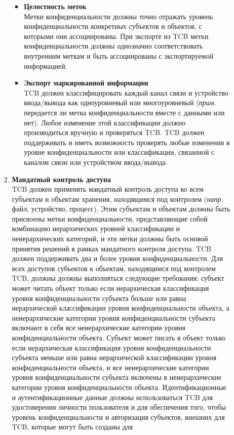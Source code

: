 \begin{enumerate}
\begin{enumerate}
\begin{enumerate}
\begin{itemize}
				\item{\textbf{Целостность меток}}\\
				Метки конфиденциальности должны точно отражать уровень конфиденциальности конкретных субъектов и объектов, с которыми они ассоциированы. При экспорте из TCB метки конфиденциальности
				должны однозначно соответствовать внутренним меткам и быть ассоциированы с экспортируемой информацией.
				\item{\textbf{Экспорт маркированной информации}}\\
				TCB должен классифицировать каждый канал связи и устройство ввода/вывода как одноуровневый или многоуровневый (\textit{прим. } передается ли метка конфиденциальности вместе с данными
				или нет). Любое изменение этой классификации должно производиться вручную и проверяться TCB. TCB должен поддерживать и иметь возможность проверять любые изменения в уровне
				конфиденциальности или классификации, связанной с каналом связи или устройством ввода/вывода.   
			\end{itemize}
			\item{\textbf{Мандатный контроль доступа}}\\
			TCB должен применять мандатный контроль доступа ко всем субъектам и объектам хранения, находящимся под контролем (\textit{напр. } файл, устройство, процесс). Этим субъектам и объектам
			должны быть присвоены метки конфиденциальности, представляющие собой комбинацию иерархических уровней классификации и неиерархических категорий, и эти метки должны быть основой принятия 
			решений в рамках мандатного контроля доступа. TCB должен поддерживать два и более уровня конфиденциальности. Для всех доступов субъектов к объектам, находящимся под контролем  TCB, должны
			должны выполняться следующие требования: субъект может читать объект только если иерархическая классификация уровня конфиденциальности субъекта больше или равна иерархической классификации
			уровня конфиденциальности объекта, а неиерархические категории уровня конфиденциальности субъекта включают в себя все неиерархические категории уровня конфиденциальности объекта. Субъект может
			писать в объект только если иерархическая классификация уровня конфиденциальности субъекта меньше или равна иерархической классификации уровня конфиденциальности объекта, и все 
			неиерархические категории уровня конфиденциальности субъекта включены в неиерархические категории уровня конфиденциальности объекта. Идентификационные и аутентификационные данные должны 
			использоваться TCB для удостоверения личности пользователя и для обеспечения того, чтобы уровень конфиденциальности и авторизация субъектов, внешних для TCB, которые могут быть созданы для

\end{enumerate}
\end{enumerate}
\end{enumerate}
